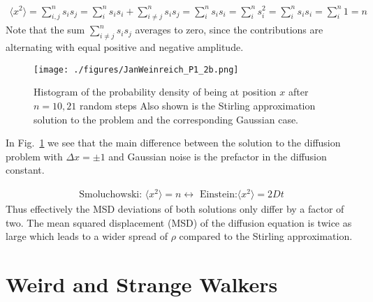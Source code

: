\documentclass[12pt]{article}
\begin{document}
 
 
\begin{align}
  \langle x^2 \rangle  = \sum_{i, j}^n s_i s_j = \sum_{i}^n s_i s_i  + \sum_{i \neq j}^n s_i s_j
  = \sum_{i}^n s_i s_i  = \sum_{i}^n s_{i}^2 = \sum_{i}^n s_i s_i  = \sum_{i}^n 1 = n  
\end{align}
Note that the sum $\sum_{i \neq j}^n s_i s_j$ averages to zero, since the contributions are alternating with
equal positive and negative amplitude.
 
 
 
 
\begin{figure}[H]
  \centering
    \texttt{[image: ./figures/JanWeinreich\_P1\_2b.png]}
    \caption{Histogram of the probability density of being at position $x$ after $n=10, 21$ random steps
            Also shown is the Stirling approximation solution to the problem and the corresponding 
            Gaussian case.}
    \label{fig:abb2}
  \end{figure}
 
 
 
 
 
 
In Fig.~\ref{fig:abb2} we see that the main difference between the solution to the diffusion
problem with $\Delta x = \pm 1$ and Gaussian noise is the prefactor in the diffusion constant.
 
\begin{align}
  \text{Smoluchowski: }
  \langle x^2 \rangle = n \leftrightarrow \text{ Einstein:}
  \langle x^2 \rangle = 2 D t
\end{align}
Thus effectively the MSD deviations of both solutions only differ by a factor of two.
The mean squared displacement (MSD) of the diffusion equation is twice as large which leads to
a wider spread of $\rho$ compared to the Stirling approximation.
 
 
 
\section{Weird and Strange Walkers}
 
\end{document}
